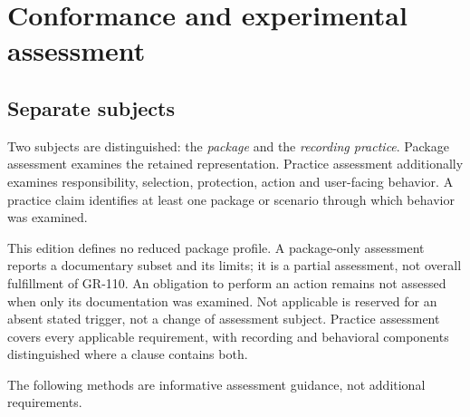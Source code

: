 \documentclass[11pt,a4paper]{article}
\begin{document}
\section{Conformance and experimental assessment}
\subsection{Separate subjects}
Two subjects are distinguished: the \emph{package} and the \emph{recording practice}. Package assessment examines the retained representation. Practice assessment additionally examines responsibility, selection, protection, action and user-facing behavior. A practice claim identifies at least one package or scenario through which behavior was examined.

This edition defines no reduced package profile. A package-only assessment reports a documentary subset and its limits; it is a partial assessment, not overall fulfillment of GR-110. An obligation to perform an action remains not assessed when only its documentation was examined. Not applicable is reserved for an absent stated trigger, not a change of assessment subject. Practice assessment covers every applicable requirement, with recording and behavioral components distinguished where a clause contains both.


The following methods are informative assessment guidance, not additional requirements.
\end{document}
